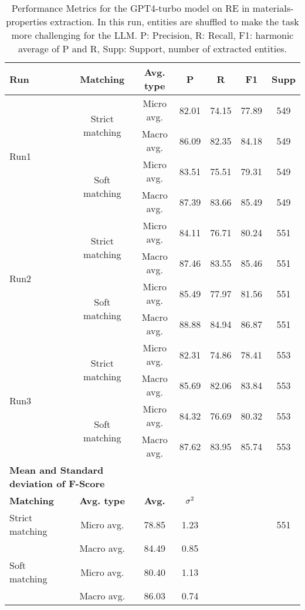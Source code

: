 
\begin{table}[htbp]
    \small
    \centering
    \caption{Performance Metrics for the GPT4-turbo model on RE in materials-properties extraction. In this run, entities are shuffled to make the task more challenging for the LLM. P: Precision, R: Recall, F1: harmonic average of P and R, Supp: Support, number of extracted entities.}
    \begin{tabular}{lcccccc}
        \toprule
        \textbf{Run} & \textbf{Matching} & \textbf{Avg. type} & \textbf{P} & \textbf{R} & \textbf{F1} & \textbf{Supp} \\
        \midrule
        \multirow{4}{*}{Run1} & \multirow{2}{*}{Strict matching} & Micro avg. & 82.01 & 74.15 & 77.89 & 549 \\
        & & Macro avg. & 86.09 & 82.35 & 84.18 & 549 \\
        \cmidrule{2-7}
        & \multirow{2}{*}{Soft matching} & Micro avg. & 83.51 & 75.51 & 79.31 & 549 \\
        & & Macro avg. & 87.39 & 83.66 & 85.49 & 549 \\
        \midrule
        \multirow{4}{*}{Run2} & \multirow{2}{*}{Strict matching} & Micro avg. & 84.11 & 76.71 & 80.24 & 551 \\
        & & Macro avg. & 87.46 & 83.55 & 85.46 & 551 \\
        \cmidrule{2-7}
        & \multirow{2}{*}{Soft matching} & Micro avg. & 85.49 & 77.97 & 81.56 & 551 \\
        & & Macro avg. & 88.88 & 84.94 & 86.87 & 551 \\
        \midrule
        \multirow{4}{*}{Run3} & \multirow{2}{*}{Strict matching} & Micro avg. & 82.31 & 74.86 & 78.41 & 553 \\
        & & Macro avg. & 85.69 & 82.06 & 83.84 & 553 \\
        \cmidrule{2-7}
        & \multirow{2}{*}{Soft matching} & Micro avg. & 84.32 & 76.69 & 80.32 & 553 \\
        & & Macro avg. & 87.62 & 83.95 & 85.74 & 553 \\
        \midrule
        \multicolumn{2}{l}{\textbf{Mean and Standard deviation of F-Score}} & & & & & \\
        \midrule
        \textbf{Matching} & \textbf{Avg. type} & \textbf{Avg.} & $\sigma\textsuperscript{2}$ & & & \\
        Strict matching & Micro avg. & 78.85 & 1.23 & & & 551 \\
        & Macro avg. & 84.49 & 0.85 & & & \\
        Soft matching & Micro avg. & 80.40 & 1.13 & & \\
        & Macro avg. & 86.03 & 0.74 & & \\
        \bottomrule
    \end{tabular}
\end{table}


